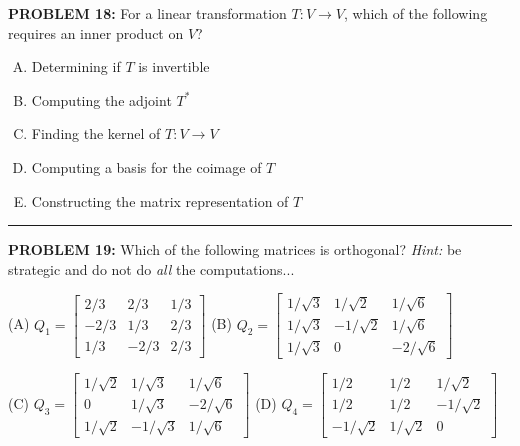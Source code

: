 \documentclass[12pt]{amsart}
\newcommand{\divider}{
  \vspace{-1em} %
  \noindent
  \raisebox{-0.15ex}{\textbullet}%
  \hspace{0.5em}%
  \rule[0.5ex]{0.95\textwidth}{1.0pt}%
  \hspace{0.5em}%
  \raisebox{-0.15ex}{\textbullet}%
  \vspace{0em} %
}
\begin{document}
{\bf PROBLEM 18:}
For a linear transformation $T:V\to V$, which of the following requires an inner product on $V$?
%
\begin{enumerate}[(A)]
\item Determining if $T$ is invertible
\item Computing the adjoint $T^*$
\item Finding the kernel of $T:V\to V$
\item Computing a basis for the coimage of $T$
\item Constructing the matrix representation of $T$
\end{enumerate}
%
\divider

\newpage

{\bf PROBLEM 19:}
Which of the following matrices is orthogonal? {\em Hint:} be strategic and do not do {\em all} the computations...

(A) $Q_1 = \begin{bmatrix} 2/3 & 2/3 & 1/3 \\ -2/3 & 1/3 & 2/3 \\ 1/3 & -2/3 & 2/3 \end{bmatrix}$ \qquad (B) $Q_2 = \begin{bmatrix} 1/\sqrt{3} & 1/\sqrt{2} & 1/\sqrt{6} \\ 1/\sqrt{3} & -1/\sqrt{2} & 1/\sqrt{6} \\ 1/\sqrt{3} & 0 & -2/\sqrt{6} \end{bmatrix}$

(C) $Q_3 = \begin{bmatrix} 1/\sqrt{2} & 1/\sqrt{3} & 1/\sqrt{6} \\ 0 & 1/\sqrt{3} & -2/\sqrt{6} \\ 1/\sqrt{2} & -1/\sqrt{3} & 1/\sqrt{6} \end{bmatrix}$ \qquad (D) $Q_4 = \begin{bmatrix} 1/2 & 1/2 & 1/\sqrt{2} \\ 1/2 & 1/2 & -1/\sqrt{2} \\ -1/\sqrt{2} & 1/\sqrt{2} & 0 \end{bmatrix}$
\end{document}
